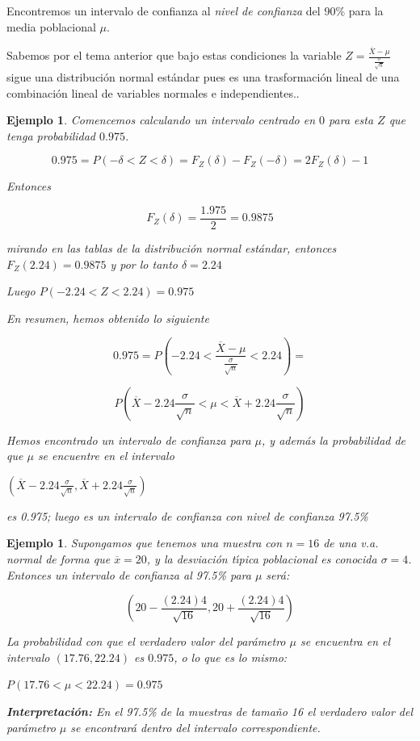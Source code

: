 \documentclass[12pt]{report}
\newtheorem{example}[definition]{Ejemplo}
\begin{document}
    Encontremos un intervalo de confianza al \emph{nivel de confianza} del
    90\% para la media poblacional $\mu$.

    Sabemos por el tema anterior que bajo estas condiciones  la variable
 $Z=\frac{\overline{X}-\mu}{\frac{\sigma}{\sqrt{n}}}$
    sigue una distribuci\'on normal est\'andar pues es una trasformaci\'on lineal
     de una combinaci\'on lineal de
    variables normales e independientes..

\begin{example}
    Comencemos calculando un intervalo centrado en $0$ para esta $Z$
    que tenga probabilidad $0.975$.


   $$0.975= P(-\delta<Z<\delta)=F_{Z}(\delta)-F_{Z}(-\delta)=
   2 F_{Z}(\delta)-1$$

   Entonces

  $$F_{Z}(\delta)=\frac{1.975}{2}=0.9875$$

   mirando en las tablas de la distribuci\'on normal est\'andar, entonces
$F_{Z}(2.24)=0.9875$ y por lo tanto $\delta=2.24$

   Luego $P(-2.24<Z<2.24)=0.975$

    En resumen, hemos obtenido lo siguiente


    $$0.975=P(-2.24<\frac{\overline{X}-\mu}{\frac{\sigma}{\sqrt{n}}}<2.24)=$$

    $$P(\overline{X} -2.24 \frac{\sigma}{\sqrt{n}}< \mu< \overline{X}+
    2.24\frac{\sigma}{\sqrt{n}})$$

    Hemos encontrado un intervalo de confianza para $\mu$, y adem\'as
    la probabilidad de que $\mu$ se encuentre en el intervalo

    $\left(\overline{X} -2.24 \frac{\sigma}{\sqrt{n}},
    \overline{X}+
    2.24\frac{\sigma}{\sqrt{n}}\right)$

    es 0.975; luego es un
    intervalo de confianza con nivel de confianza 97.5\%
\end{example}

    \begin{example}
    Supongamos que tenemos una muestra con $n=16$
    de una v.a. normal de forma que $\overline{x}=20$, y la desviaci\'on
    t\'{\i}pica poblacional es conocida $\sigma=4$.
    Entonces un intervalo de confianza al 97.5\% para $\mu$
    ser\'a:

    $$\left( 20-\frac{(2.24) 4}{\sqrt{16}} ,
    20+\frac{(2.24) 4}{\sqrt{16}}\right)$$

    La probabilidad con que el verdadero valor del par\'ametro $\mu$ se
    encuentra en el intervalo $\left( 17.76,22.24\right)$ es $0.975$,
    o lo que es lo mismo:

    $P(17.76<\mu<22.24)=0.975$


    \textbf{Interpretaci\'on:} En el 97.5\%
    de la muestras de tama\~{n}o 16 el verdadero valor del par\'ametro
    $\mu$ se encontrar\'a dentro del intervalo correspondiente.
    \end{example}
\end{document}
